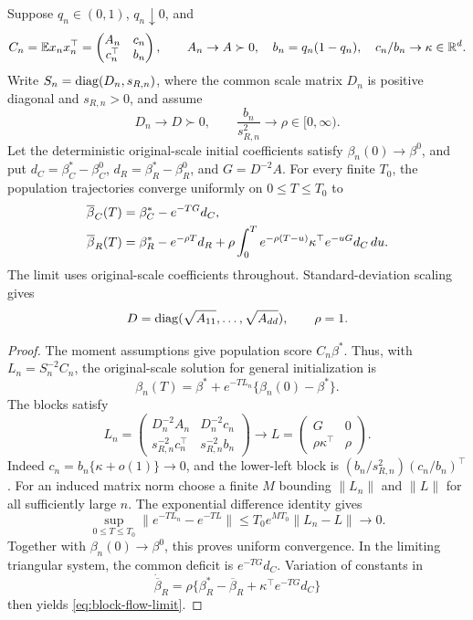 \begin{proposition}
 \label{prop:block-flow-limit}
 Suppose $q_n \in (0,1)$, $q_n \downarrow 0$, and
 \[
  C_n = \mathbb{E} x_nx_n^\top
      = \begin{pmatrix}
         A_n      & c_n \\
         c_n^\top & b_n
        \end{pmatrix},\qquad A_n
      \to A
      \succ 0,\quad b_n
      = q_n(1 - q_n),\quad c_n/b_n
      \to \kappa
      \in \mathbb{R}^d.
 \]
 Write $S_n = \operatorname{diag}(D_n,s_{R,n})$, where the common scale matrix $D_n$ is
 positive diagonal and $s_{R,n} > 0$, and assume
 \[
  D_n \to D \succ 0,\qquad \frac{b_n}{s_{R,n}^2} \to \rho \in [0,\infty).
 \]
 Let the deterministic original-scale initial coefficients satisfy
 $\beta_n(0) \to \beta^0$, and put $d_C = \beta_C^* - \beta_C^0$,
 $d_R = \beta_R^* - \beta_R^0$, and $G = D^{-2}A$. For every finite $T_0$, the
 population trajectories converge uniformly on $0 \le T \le T_0$ to
 \begin{align}
  \overline\beta_C(T) & = \beta_C^* - e^{-TG}d_C,\notag                                                                                   \\
  \overline\beta_R(T) & = \beta_R^* - e^{-\rho T}d_R + \rho\int_0^T e^{-\rho(T-u)}\kappa^\top e^{-uG}d_C\,du. \label{eq:block-flow-limit}
 \end{align}
 The limit uses original-scale coefficients throughout. Standard-deviation
 scaling gives
 \[
  D = \operatorname{diag}(\sqrt{A_{11}},\ldots,\sqrt{A_{dd}}),\qquad \rho = 1.
 \]
\end{proposition}
\begin{proof}
 The moment assumptions give population score $C_n\beta^*$. Thus, with
 $L_n = S_n^{-2}C_n$, the original-scale solution for general initialization is
 \[
  \beta_n(T) = \beta^* + e^{-TL_n}\{\beta_n(0) - \beta^*\}.
 \]
 The blocks satisfy
 \[
  L_n = \begin{pmatrix}
         D_n^{-2}A_n          & D_n^{-2}c_n     \\
         s_{R,n}^{-2}c_n^\top & s_{R,n}^{-2}b_n
        \end{pmatrix}
      \longrightarrow L
      = \begin{pmatrix}
         G               & 0    \\
         \rho\kappa^\top & \rho
        \end{pmatrix}.
 \]
 Indeed $c_n = b_n\{\kappa + o(1)\} \to 0$, and the lower-left block is
 $(b_n/s_{R,n}^2)(c_n/b_n)^\top$. For an induced matrix norm choose a finite $M$
 bounding $\|L_n\|$ and $\|L\|$ for all sufficiently large $n$. The exponential
 difference identity gives
 \[
  \sup_{0 \le T \le T_0}\|e^{-TL_n} - e^{-TL}\| \le T_0 e^{MT_0}\|L_n - L\|
                                                \longrightarrow 0.
 \]
 Together with $\beta_n(0) \to \beta^0$, this proves uniform convergence. In the
 limiting triangular system, the common deficit is $e^{-TG}d_C$. Variation of
 constants in
 \[
  \dot{\overline\beta}_R = \rho\{\beta_R^* - \overline\beta_R + \kappa^\top e^{-TG}d_C\}
 \]
 then yields \eqref{eq:block-flow-limit}.
\end{proof}

